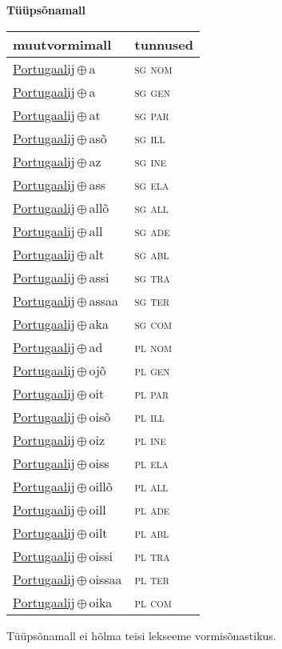

\vspace{3.5em}
\noindent \begin{minipage}{\textwidth}
\noindent \textbf{Tüüpsõnamall \,}\\

\begin{sideways}
\begin{tabular}{l l}
muutvormimall & tunnused \\
\hline
\underline{Portugaalij}\,$\oplus$\,a & \textsc{ sg nom } \\
\underline{Portugaalij}\,$\oplus$\,a & \textsc{ sg gen } \\
\underline{Portugaalij}\,$\oplus$\,at & \textsc{ sg par } \\
\underline{Portugaalij}\,$\oplus$\,asõ & \textsc{ sg ill } \\
\underline{Portugaalij}\,$\oplus$\,az & \textsc{ sg ine } \\
\underline{Portugaalij}\,$\oplus$\,ass & \textsc{ sg ela } \\
\underline{Portugaalij}\,$\oplus$\,allõ & \textsc{ sg all } \\
\underline{Portugaalij}\,$\oplus$\,all & \textsc{ sg ade } \\
\underline{Portugaalij}\,$\oplus$\,alt & \textsc{ sg abl } \\
\underline{Portugaalij}\,$\oplus$\,assi & \textsc{ sg tra } \\
\underline{Portugaalij}\,$\oplus$\,assaa & \textsc{ sg ter } \\
\underline{Portugaalij}\,$\oplus$\,aka & \textsc{ sg com } \\
\underline{Portugaalij}\,$\oplus$\,ad & \textsc{ pl nom } \\
\underline{Portugaalij}\,$\oplus$\,ojõ & \textsc{ pl gen } \\
\underline{Portugaalij}\,$\oplus$\,oit & \textsc{ pl par } \\
\underline{Portugaalij}\,$\oplus$\,oisõ & \textsc{ pl ill } \\
\underline{Portugaalij}\,$\oplus$\,oiz & \textsc{ pl ine } \\
\underline{Portugaalij}\,$\oplus$\,oiss & \textsc{ pl ela } \\
\underline{Portugaalij}\,$\oplus$\,oillõ & \textsc{ pl all } \\
\underline{Portugaalij}\,$\oplus$\,oill & \textsc{ pl ade } \\
\underline{Portugaalij}\,$\oplus$\,oilt & \textsc{ pl abl } \\
\underline{Portugaalij}\,$\oplus$\,oissi & \textsc{ pl tra } \\
\underline{Portugaalij}\,$\oplus$\,oissaa & \textsc{ pl ter } \\
\underline{Portugaalij}\,$\oplus$\,oika & \textsc{ pl com } \\
\end{tabular}
\end{sideways}
\label{tab:tüüpsõnamall-portugaalija}

\end{minipage}

 
\vspace{1em}
\noindent Tüüpsõnamall  ei hõlma teisi lekseeme vormi\-sõnastikus.
